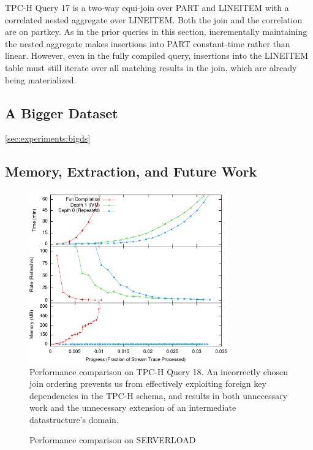 TPC-H Query 17 is a two-way equi-join over PART and LINEITEM with a correlated nested aggregate over LINEITEM.  Both the join and the correlation are on partkey.  As in the prior queries in this section, incrementally maintaining the nested aggregate makes insertions into PART constant-time rather than linear.  However, even in the fully compiled query, insertions into the LINEITEM table must still iterate over all matching results in the join, which are already being materialized.  

\subsection{A Bigger Dataset}
\ref{sec:experiments:bigds}


\subsection{Memory, Extraction, and Future Work}
\label{sec:experiments:future}
\begin{figure}
\begin{center}
\includegraphics[width=3.4in]{../graphs/graphs/unified_tpch18.pdf}
\caption{Performance comparison on TPC-H Query 18.  An incorrectly chosen join ordering prevents us from effectively exploiting foreign key dependencies in the TPC-H schema, and results in both unnecessary work and the unnecessary extension of an intermediate datastructure's domain.}
\label{fig:experiments:tpch18}
\end{center}
\end{figure}

\begin{figure}
\begin{center}
\caption{Performance comparison on SERVERLOAD}
\label{fig:experiments:serverload}
\end{center}
\end{figure}

